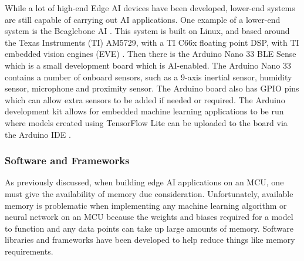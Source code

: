 \documentclass[conference]{IEEEtran}
\begin{document}
While a lot of high-end Edge AI devices have been developed, lower-end systems are still capable of carrying out AI applications. One example of a lower-end system is the Beaglebone AI \cite{b8}. This system is built on Linux, and based around the Texas Instruments (TI) AM5729, with a TI C66x floating point DSP, with TI embedded vision engines (EVE) \cite{b9}. Then there is the Arduino Nano 33 BLE Sense which is a small development board which is AI-enabled. The Arduino Nano 33 contains a number of onboard sensors, such as a 9-axis inertial sensor, humidity sensor, microphone and proximity sensor. The Arduino board also has GPIO pins which can allow extra sensors to be added if needed or required. The Arduino development kit allows for embedded machine learning applications to be run where models created using TensorFlow Lite can be uploaded to the board via the Arduino IDE \cite{b10}.


\subsubsection{Software and Frameworks}
As previously discussed, when building edge AI applications on an MCU, one must give the availability of memory due consideration. Unfortunately, available memory is problematic when implementing any machine learning algorithm or neural network on an MCU because the weights and biases required for a model to function and any data points can take up large amounts of memory. Software libraries and frameworks have been developed to help reduce things like memory requirements.
\end{document}
